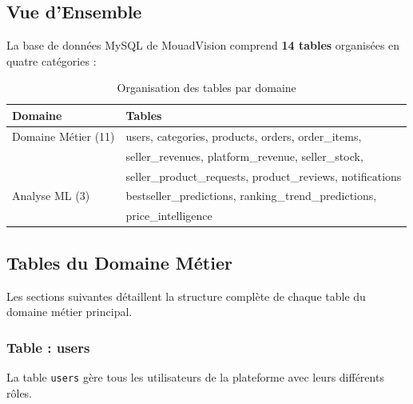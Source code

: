 \documentclass[12pt,a4paper]{report}
\begin{document}
\subsection{Vue d'Ensemble}

La base de données MySQL de MouadVision comprend \textbf{14 tables} organisées en quatre catégories :

\begin{table}[H]
    \centering
    \caption{Organisation des tables par domaine}
    \begin{tabular}{ll}
        \toprule
        \textbf{Domaine} & \textbf{Tables} \\
        \midrule
        Domaine Métier (11) & users, categories, products, orders, order\_items, \\
                           & seller\_revenues, platform\_revenue, seller\_stock, \\
                           & seller\_product\_requests, product\_reviews, notifications \\
        \midrule
        Analyse ML (3) & bestseller\_predictions, ranking\_trend\_predictions, \\
                       & price\_intelligence \\
        \bottomrule
    \end{tabular}
    \label{tab:tables_overview}
\end{table}

\subsection{Tables du Domaine Métier}

Les sections suivantes détaillent la structure complète de chaque table du domaine métier principal.

\subsubsection{Table : users}

La table \texttt{users} gère tous les utilisateurs de la plateforme avec leurs différents rôles.
\end{document}
